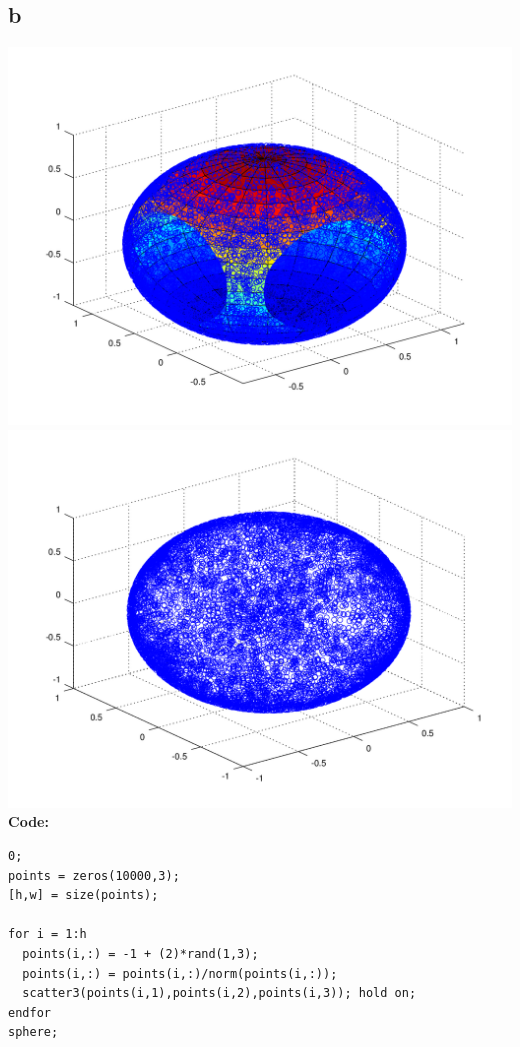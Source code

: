 \documentclass[a4paper,10pt]{article}
\begin{document}
\subsection*{b}
	\includegraphics[scale=0.5]{sphere_1.png}\\
	\includegraphics[scale=0.5]{sphere.png}
	\textbf{Code:}\\
	\begin{lstlisting}
0;
points = zeros(10000,3);
[h,w] = size(points);

for i = 1:h
  points(i,:) = -1 + (2)*rand(1,3);
  points(i,:) = points(i,:)/norm(points(i,:));
  scatter3(points(i,1),points(i,2),points(i,3)); hold on;
endfor
sphere;
	\end{lstlisting}
\end{document}
